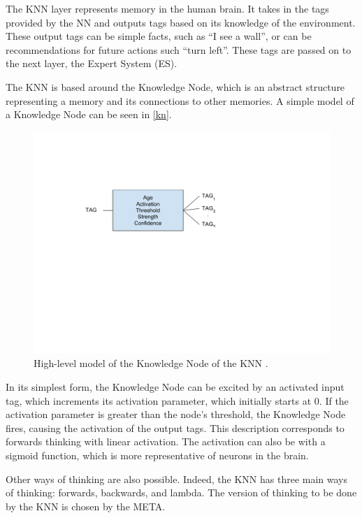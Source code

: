 \documentclass[titlepage,11pt]{article}
\newcommand{\ar}[1]{\autoref{#1}}
\begin{document}
The KNN layer represents memory in the human brain. It takes in the tags provided by the NN and outputs tags based on its knowledge of the environment. These output tags can be simple facts, such as ``I see a wall'', or can be recommendations for future actions such ``turn left''. These tags are passed on to the next layer, the Expert System (ES).

The KNN is based around the Knowledge Node, which is an abstract structure representing a memory and its connections to other memories. A simple model of a Knowledge Node can be seen in \ar{kn}.

\begin{figure}[!htb]
	\includegraphics[width=\columnwidth]{figures/kn.pdf}
	\caption[High-level model of the Knowledge Node of the KNN.]
	{High-level model of the Knowledge Node of the KNN \cite{vybihal-knowledge}.}
	\label{kn}
\end{figure}

In its simplest form, the Knowledge Node can be excited by an activated input tag, which increments its activation parameter, which initially starts at 0. If the activation parameter is greater than the node's threshold, the Knowledge Node fires, causing the activation of the output tags. This description corresponds to forwards thinking with linear activation. The activation can also be with a sigmoid function, which is more representative of neurons in the brain.

Other ways of thinking are also possible. Indeed, the KNN has three main ways of thinking: forwards, backwards, and lambda. The version of thinking to be done by the KNN is chosen by the META.
\end{document}

